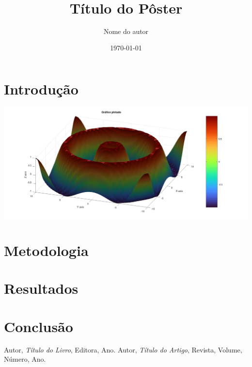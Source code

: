 \documentclass[a0,portrait]{a0poster}
\title{Título do Pôster}
\author{Nome do autor}
\date{\today}
\begin{document}
\maketitle

\begin{abstract}
\lipsum[1]
\end{abstract}

\section{Introdução}
\lipsum[2-3]

\includegraphics{grafico.jpg}

\section{Metodologia}
\lipsum[4-5]

\section{Resultados}
\lipsum[6-7]

\section{Conclusão}
\lipsum[8]

\begin{thebibliography}{9}
 Autor, \textit{Título do Livro}, Editora, Ano.
 Autor, \textit{Título do Artigo}, Revista, Volume, Número, Ano.
\end{thebibliography}
\end{document}
